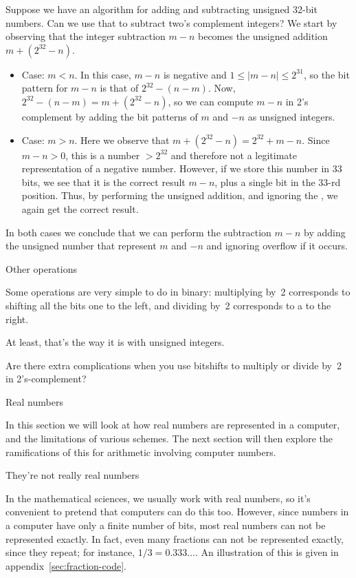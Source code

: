 Suppose we have an algorithm for adding and subtracting unsigned
32-bit numbers. Can we use that to subtract two's complement integers?
We start by observing that the integer subtraction $m-n$ becomes the
unsigned addition $m+(2^{32}-n)$.
\begin{itemize}
\item Case: $m<{n}$. In this case, $m-n$ is negative and $1\leq
  |m-n|\leq 2^{31}$, so the bit pattern for $m-n$ is that of
  $2^{32}-(n-m)$. Now, $2^{32}-(n-m)=m+(2^{32}-n)$, so we can compute
  $m-n$ in 2's complement by adding the bit patterns of $m$ and $-n$ as
  unsigned integers.
\item Case: $m>n$. Here we observe that
  $m+(2^{32}-n)=2^{32}+m-n$. Since $m-n>0$, this is a number $>2^{32}$
  and therefore not a legitimate
  representation of a negative number. However, if we store this
  number in 33 bits, we see that it is
  the correct result $m-n$, plus a single bit in the
  33-rd position. Thus, by performing the unsigned addition, and
  ignoring the , we again get the correct result.
\end{itemize}
In both cases we conclude that we can perform the subtraction $m-n$ by adding
the unsigned number that represent $m$ and $-n$
and ignoring overflow if it occurs.

 {Other operations}

Some operations are very simple to do in binary: multiplying by~2
corresponds to shifting all the bits one to the left, and dividing
by~2 corresponds to a  to the right.

At least, that's the way it is with unsigned integers.
\begin{exercise}
  Are there extra complications when you use bitshifts to multiply or
  divide by~2 in 2's-complement?
\end{exercise}

 {Real numbers}

In this section we will look at how real numbers are
represented in a computer, and the limitations of various schemes. The
next section will then explore the ramifications of this for arithmetic
involving computer numbers.

 {They're not really real numbers}
\label{sec:arith-intro}

In the mathematical sciences, we usually work with real numbers, so
it's convenient to pretend that computers can do this too. However,
since numbers in a computer have only a finite number of bits, most
real numbers can not be represented exactly. In fact, even many
fractions can not be represented exactly, since they repeat; for
instance, $1/3=0.333\ldots$. An illustration of this is given in
appendix~\ref{sec:fraction-code}.


